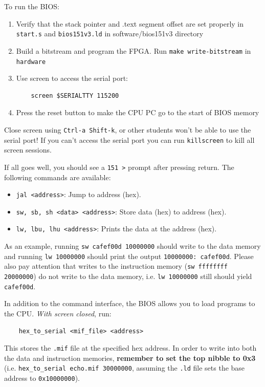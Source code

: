 \documentclass[11pt]{article}
\begin{document}
To run the BIOS:
\begin{enumerate}
  \item Verify that the stack pointer and .text segment offset are set properly in \verb|start.s| and \verb|bios151v3.ld| in software/bios151v3 directory
  \item Build a bitstream and program the FPGA. Run \verb|make write-bitstream| in \verb|hardware|
  \item Use screen to access the serial port:
    \begin{verbatim}
    screen $SERIALTTY 115200
    \end{verbatim}
  \item Press the reset button to make the CPU PC go to the start of BIOS memory
\end{enumerate}

Close screen using \verb|Ctrl-a Shift-k|, or other students won't be able to use the serial port!
If you can't access the serial port you can run \verb|killscreen| to kill all screen sessions.

If all goes well, you should see a \verb|151 >| prompt after pressing return. The following commands are available:
\begin{itemize}
    \item \verb|jal <address>|: Jump to address (hex).
    \item \verb|sw, sb, sh <data> <address>|: Store data (hex) to address (hex).
    \item \verb|lw, lbu, lhu <address>|: Prints the data at the address (hex).
\end{itemize}

As an example, running \verb|sw cafef00d 10000000| should write to the data memory and running \verb|lw 10000000| should print the output \verb|10000000: cafef00d|.
Please also pay attention that writes to the instruction memory (\verb|sw ffffffff 20000000|) do not write to the data memory, i.e. \verb|lw 10000000| still should yield \verb|cafef00d|.

In addition to the command interface, the BIOS allows you to load programs to the CPU. \textit{With screen closed}, run:
\begin{verbatim}
    hex_to_serial <mif_file> <address>
\end{verbatim}

This stores the \verb|.mif| file at the specified hex address.
In order to write into both the data and instruction memories, \textbf{remember to set the top nibble to 0x3} (i.e. \verb|hex_to_serial echo.mif 30000000|, assuming the \verb|.ld| file sets the base address to \verb|0x10000000|).
\end{document}
